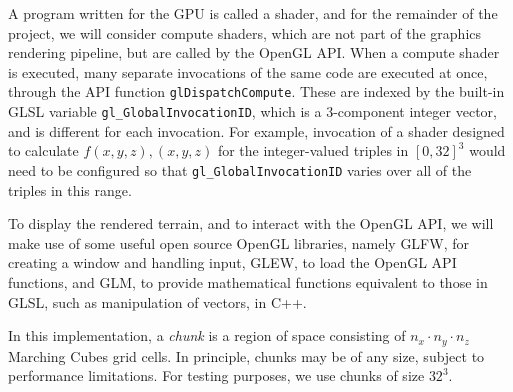 \documentclass{article}
\begin{document}
A program written for the GPU is called a shader, and for the remainder of the project, we will consider compute shaders, which are not part of the graphics rendering pipeline, but are called by the OpenGL API. When a compute shader is executed, many separate invocations of the same code are executed at once, through the API function \texttt{glDispatchCompute}. These are indexed by the built-in GLSL variable \texttt{gl\_GlobalInvocationID}, which is a 3-component integer vector, and is different for each invocation. For example, invocation of a shader designed to calculate $f\left(x,y,z\right), \left(x,y,z\right)$ for the integer-valued triples in $\left[0,32\right]^3$ would need to be configured so that \texttt{gl\_GlobalInvocationID} varies over all of the triples in this range.

To display the rendered terrain, and to interact with the OpenGL API, we will make use of some useful open source OpenGL libraries, namely GLFW\cite{glfw}, for creating a window and handling input, GLEW\cite{glew}, to load the OpenGL API functions, and GLM\cite{g-truc_2005}, to provide mathematical functions equivalent to those in GLSL, such as manipulation of vectors, in C++.

In this implementation, a \textit{chunk} is a region of space consisting of $n_x \cdot n_y \cdot n_z$ Marching Cubes grid cells. In principle, chunks may be of any size, subject to performance limitations. For testing purposes, we use chunks of size $32^3$. 
\end{document}

